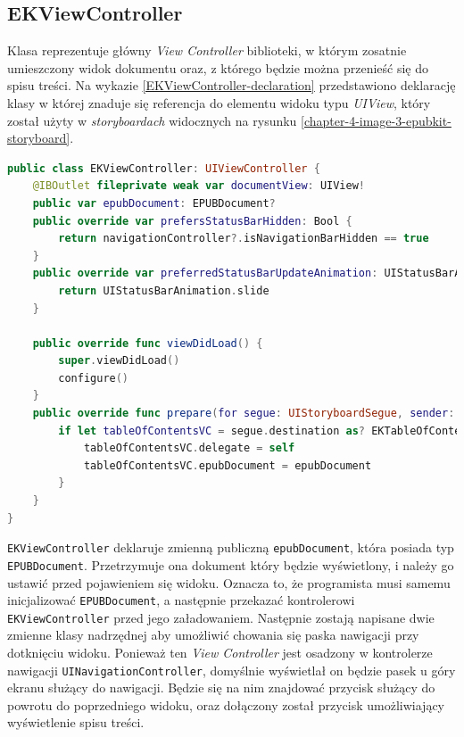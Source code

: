 \subsection{EKViewController}

Klasa reprezentuje główny \textit{View Controller} biblioteki, w którym zosatnie umieszczony widok dokumentu oraz, z którego będzie można przenieść się do spisu treści. Na wykazie \ref{EKViewController-declaration} przedstawiono deklarację klasy w której znaduje się referencja do elementu widoku typu \textit{UIView}, który został użyty w \textit{storyboardach} widocznych na rysunku \ref{chapter-4-image-3-epubkit-storyboard}.

\begin{lstlisting}[language=swift,caption={Deklaracja klasy texttt{EKViewController}},label=EKViewController-declaration]
public class EKViewController: UIViewController {
    @IBOutlet fileprivate weak var documentView: UIView!
    public var epubDocument: EPUBDocument?
    public override var prefersStatusBarHidden: Bool {
        return navigationController?.isNavigationBarHidden == true
    }
    public override var preferredStatusBarUpdateAnimation: UIStatusBarAnimation {
        return UIStatusBarAnimation.slide
    }

    public override func viewDidLoad() {
        super.viewDidLoad()
        configure()
    }
    public override func prepare(for segue: UIStoryboardSegue, sender: Any?) {
        if let tableOfContentsVC = segue.destination as? EKTableOfContentsViewController {
            tableOfContentsVC.delegate = self
            tableOfContentsVC.epubDocument = epubDocument
        }
    }
}
\end{lstlisting}

\texttt{EKViewController} deklaruje zmienną publiczną \texttt{epubDocument}, która posiada typ \texttt{EPUBDocument}. Przetrzymuje ona dokument który będzie wyświetlony, i należy go ustawić przed pojawieniem się widoku. Oznacza to, że programista musi samemu inicjalizować \texttt{EPUBDocument}, a następnie przekazać kontrolerowi \texttt{EKViewController} przed jego załadowaniem. Następnie zostają napisane dwie zmienne klasy nadrzędnej aby umożliwić chowania się paska nawigacji przy dotknięciu widoku. Ponieważ ten \textit{View Controller} jest osadzony w kontrolerze nawigacji \texttt{UINavigationController}, domyślnie wyświetlał on będzie pasek u góry ekranu służący do nawigacji. Będzie się na nim znajdować przycisk służący do powrotu do poprzedniego widoku, oraz dołączony został przycisk umożliwiający wyświetlenie spisu treści.

